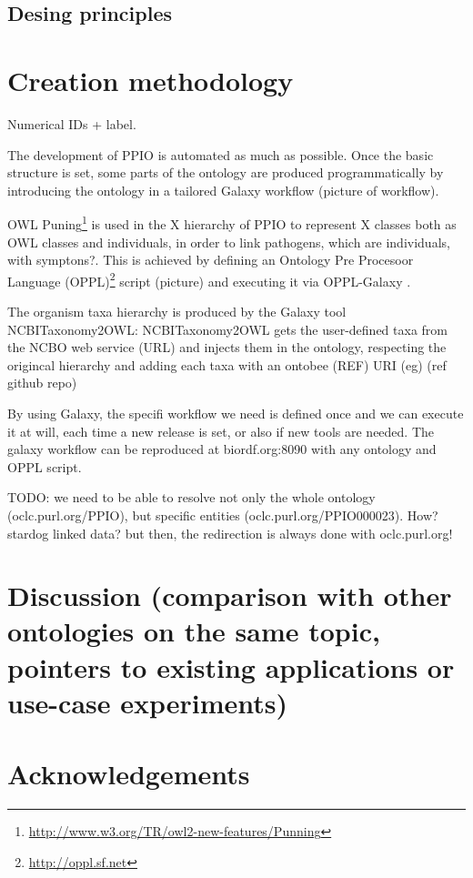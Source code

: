 \documentclass[sw]{iosart2c}
\newcommand{\myurl}[1]{\footnote{\url{#1}}}
\begin{document}
\subsection{Desing principles}



\section{Creation methodology}

Numerical IDs + label.

The development of PPIO is automated as much as possible. Once the basic structure is set, some parts of the ontology are produced programmatically by introducing the ontology in a tailored Galaxy \cite{galaxy} workflow  (picture of workflow). 

OWL Puning\myurl{http://www.w3.org/TR/owl2-new-features/Punning} is used in the X hierarchy of PPIO to represent X classes both as OWL classes and individuals, in order to link pathogens, which are individuals, with symptons?. This is achieved by defining an Ontology Pre Procesoor Language (OPPL)\myurl{http://oppl.sf.net} script (picture) and executing it via OPPL-Galaxy \cite{OPPL-Galaxy-JBMS}.

The organism taxa hierarchy is produced by the Galaxy tool NCBITaxonomy2OWL: NCBITaxonomy2OWL gets the user-defined taxa from the NCBO web service (URL) and injects them in the ontology, respecting the origincal hierarchy and adding each taxa with an ontobee (REF) URI (eg) (ref github repo)

By using Galaxy, the specifi workflow we need is defined once and we can execute it at will, each time a new release is set, or also if new tools are needed. The galaxy workflow can be reproduced at biordf.org:8090 with any ontology and OPPL script.

TODO: we need to be able to resolve not only the whole ontology (oclc.purl.org/PPIO), but specific entities (oclc.purl.org/PPIO000023). How? stardog linked data? but then, the redirection is always done with oclc.purl.org!



\section{Discussion (comparison with other ontologies on the same topic, pointers to existing applications or use-case experiments)}

\section*{Acknowledgements}
\end{document}
